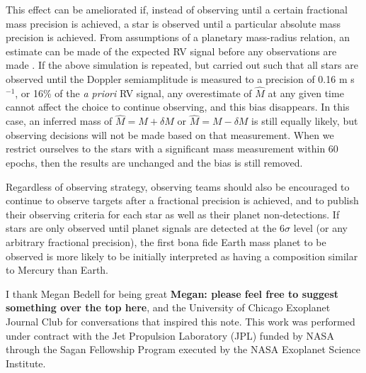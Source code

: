 \documentclass[rnaas]{aastex62}
\begin{document}
This effect can be ameliorated if, instead of observing until a certain fractional mass precision is achieved, a star is observed until a particular absolute mass precision is achieved. 
From assumptions of a planetary mass-radius relation, an estimate can be made of the expected RV signal before any observations are made \citep[e.g.][]{Chen17}. If the above simulation is repeated, but carried out such that all stars are observed until the Doppler semiamplitude is measured to a precision of 0.16 m s$^{-1}$, or 16\% of the \textit{a priori} RV signal, any overestimate of $\hat{M}$ at any given time cannot affect the choice to continue observing, and this bias disappears. In this case, an inferred mass of $\hat{M} = M + \delta M$ or $\hat{M} = M - \delta M$ is still equally likely, but observing decisions will not be made based on that measurement. When we restrict ourselves to the stars with a significant mass measurement within 60 epochs, then the results are unchanged and the bias is still removed.

Regardless of observing strategy, observing teams should also be encouraged to continue to observe targets after a fractional precision is achieved, and to publish their observing criteria for each star as well as their planet non-detections. If stars are only observed until planet signals are detected at the 6$\sigma$ level (or any arbitrary fractional precision), the first bona fide Earth mass planet to be observed is more likely to be initially interpreted as having a composition similar to Mercury than Earth.




\acknowledgments

I thank Megan Bedell for being great \textbf{Megan: please feel free to suggest something over the top here}, and the University of Chicago Exoplanet Journal Club for conversations that inspired this note. This work was performed under contract with the Jet Propulsion
Laboratory (JPL) funded by NASA through the Sagan Fellowship Program executed
by the NASA Exoplanet Science Institute.



\end{document}
